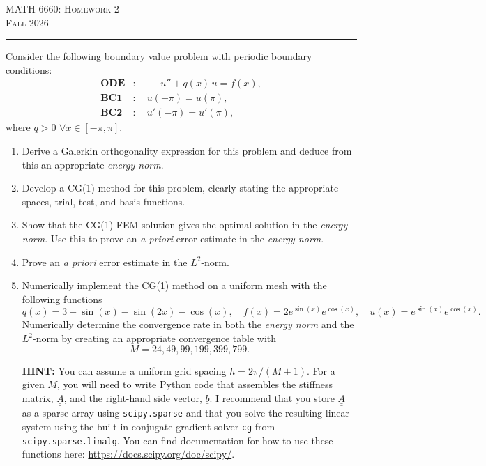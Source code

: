 \documentclass[11pt]{article}
\newcommand{\hwsecfont}{\Large\bfseries}
\newcommand{\hwsection}[1]{%
  \par\addvspace{\hwsecA}%
  \sbox{\hwsecbox}{\hwsecfont #1}%
  \noindent\usebox{\hwsecbox}\par\nobreak
  \nointerlineskip\vspace{\hwsecB}%
  \noindent\rule{\wd\hwsecbox}{0.4pt}\par\nobreak
  \nointerlineskip\vspace{\hwsecC}%
}
\newcommand{\hwsecA}{24.3pt}
\newcommand{\hwsecB}{1.6pt}
\newcommand{\hwsecC}{13.6pt}
\begin{document}
\begin{center}
  {\large\textsc{MATH 6660: Homework 2}}\\
  {\large\textsc{Fall 2026}}
\end{center}

\hwsection{CG(1) for 2-pt BVP with periodic BCs:}

Consider the following boundary value problem with periodic boundary conditions:
\begin{align*}
  \textbf{ODE} &: \quad -\, u'' + q(x)\,u = f(x),\\
  \textbf{BC1} &: \quad u(-\pi) = u(\pi),\\
  \textbf{BC2} &: \quad u'(-\pi) = u'(\pi),
\end{align*}
where $q>0$ $\forall x\in[-\pi,\pi]$.

\begin{enumerate}

\item Derive a Galerkin orthogonality expression for this problem and deduce
from this an appropriate \emph{energy norm}.

\item Develop a CG(1) method for this problem, clearly stating the appropriate
spaces, trial, test, and basis functions.

\item Show that the CG(1) FEM solution gives the optimal solution in the
\emph{energy norm}. Use this to prove an \emph{a priori} error estimate in the
\emph{energy norm}.

\item Prove an \emph{a priori} error estimate in the $L^{2}$-norm.

\item Numerically implement the CG(1) method on a uniform mesh with the
following functions
\[
  q(x) = 3-\sin(x)-\sin(2x)-\cos(x), \quad
  f(x) = 2e^{\sin(x)}e^{\cos(x)}, \quad
  u(x) = e^{\sin(x)}e^{\cos(x)}.
\]
Numerically determine the convergence rate in both the \emph{energy norm} and
the $L^{2}$-norm by creating an appropriate convergence table with
\[
  M = 24, 49, 99, 199, 399, 799.
\]

\vspace{4.4pt}%
\textbf{HINT:} You can assume a uniform grid spacing $h = 2\pi/\left(M+1\right)$.
For a given $M$, you will need to write Python code that assembles the stiffness
matrix, $\underline{\underline{A}}$, and the right-hand side vector,
$\underline{b}$. I recommend that you store $\underline{\underline{A}}$ as a
sparse array using \texttt{scipy.sparse} and that you solve the resulting linear
system using the built-in conjugate gradient solver \texttt{cg} from
\texttt{scipy.sparse.linalg}. You can find documentation for how to use these
functions here: \url{https://docs.scipy.org/doc/scipy/}.

\end{enumerate}
\end{document}

